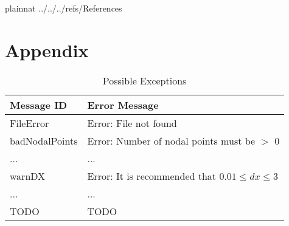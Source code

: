 \documentclass[12pt, titlepage]{article}
\begin{document}
\newpage

 {plainnat}
 {../../../refs/References}

\newpage

\section{Appendix} \label{Appendix}

\begin{table}[h!]
  \caption{Possible Exceptions}
  \label{TblExceptions}
  \centering
  \begin{tabular}{p{} p{}}
  \toprule
  \textbf{Message ID} & \textbf{Error Message}\\
  \midrule
  {FileError} & Error: File not found \\
  {badNodalPoints} & Error: Number of nodal points must be $>$ 0 \\
  ... & ... \\
  {warnDX} & Error: It is recommended that $0.01 \le dx \le 3$\\
  ... & ... \\
  TODO & TODO \\
  \bottomrule
  \end{tabular}
  \end{table}
\end{document}
